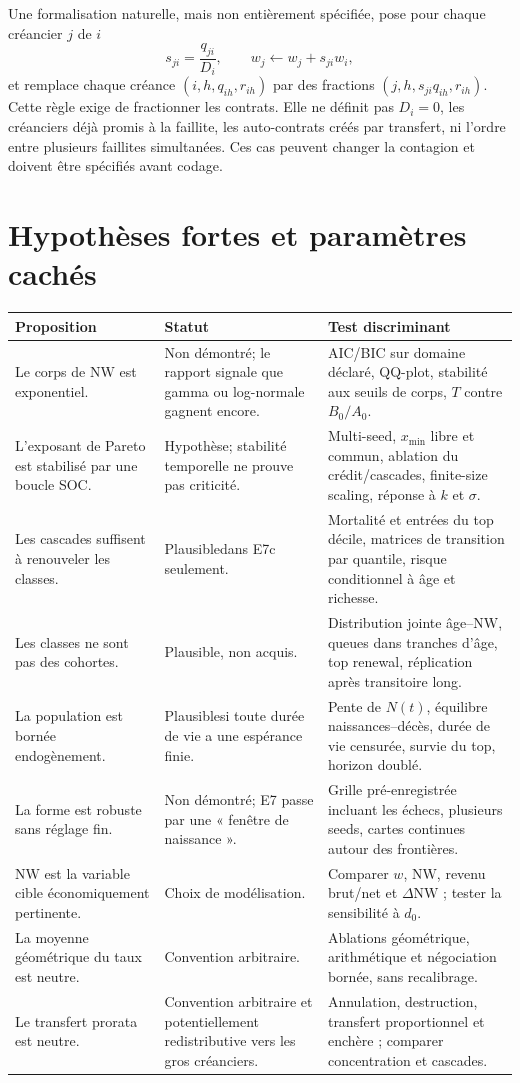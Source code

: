 \documentclass[11pt,a4paper]{article}
\newcommand{\NW}{\mathrm{NW}}
\newcommand{\hyp}{\textcolor{orange!70!black}{Hypothèse}}
\newcommand{\plaus}{\textcolor{blue!65!black}{Plausible}}
\newcommand{\und}{\textcolor{red!65!black}{Non démontré}}
\begin{document}
Une formalisation naturelle, mais non entièrement spécifiée, pose pour chaque
créancier $j$ de $i$
\[
 s_{ji}=\frac{q_{ji}}{D_i},\qquad
 w_j\leftarrow w_j+s_{ji}w_i,
\]
et remplace chaque créance $(i,h,q_{ih},r_{ih})$ par des fractions
$(j,h,s_{ji}q_{ih},r_{ih})$. Cette règle exige de fractionner les contrats. Elle
ne définit pas $D_i=0$, les créanciers déjà promis à la faillite, les
auto-contrats créés par transfert, ni l'ordre entre plusieurs faillites
simultanées. Ces cas peuvent changer la contagion et doivent être spécifiés avant
codage.

\section{Hypothèses fortes et paramètres cachés}

\begin{longtable}{p{}p{}p{}}
\toprule
Proposition & Statut & Test discriminant \\
\midrule
\endhead
Le corps de $\NW$ est exponentiel. & \und ; le rapport signale que gamma ou
log-normale gagnent encore. & AIC/BIC sur domaine déclaré, QQ-plot, stabilité aux
seuils de corps, $T$ contre $B_0/A_0$. \\
L'exposant de Pareto est stabilisé par une boucle SOC. & \hyp ; stabilité
temporelle ne prouve pas criticité. & Multi-seed, $x_{\min}$ libre et commun,
ablation du crédit/cascades, finite-size scaling, réponse à $k$ et $\sigma$. \\
Les cascades suffisent à renouveler les classes. & \plaus dans E7c seulement. &
Mortalité et entrées du top décile, matrices de transition par quantile, risque
conditionnel à âge et richesse. \\
Les classes ne sont pas des cohortes. & \plaus, non acquis. & Distribution
jointe âge--$\NW$, queues dans tranches d'âge, top renewal, réplication après
transitoire long. \\
La population est bornée endogènement. & \plaus si toute durée de vie a une
espérance finie. & Pente de $N(t)$, équilibre naissances--décès, durée de vie
censurée, survie du top, horizon doublé. \\
La forme est robuste sans réglage fin. & \und ; E7 passe par une « fenêtre de
naissance ». & Grille pré-enregistrée incluant les échecs, plusieurs seeds, cartes
continues autour des frontières. \\
$\NW$ est la variable cible économiquement pertinente. & Choix de modélisation.
& Comparer $w$, $\NW$, revenu brut/net et $\Delta\NW$ ; tester la sensibilité à
$d_0$. \\
La moyenne géométrique du taux est neutre. & Convention arbitraire. & Ablations
géométrique, arithmétique et négociation bornée, sans recalibrage. \\
Le transfert prorata est neutre. & Convention arbitraire et potentiellement
redistributive vers les gros créanciers. & Annulation, destruction, transfert
proportionnel et enchère ; comparer concentration et cascades. \\
\bottomrule
\end{longtable}
\end{document}
